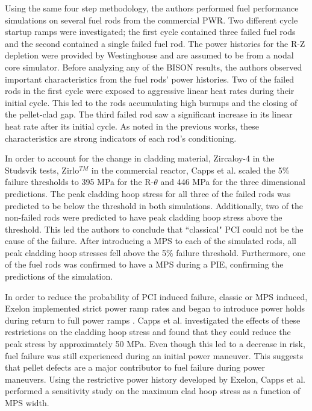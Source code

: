 \documentclass[edeposit,fullpage,11pt]{uiucthesis2009}
\begin{document}
Using the same four step methodology, the authors performed fuel performance simulations on several fuel rods from the commercial \gls{PWR}.
Two different cycle startup ramps were investigated; the first cycle contained three failed fuel rods and the second contained a single failed fuel rod.
The power histories for the R-Z depletion were provided by Westinghouse and are assumed to be from a nodal core simulator.
Before analyzing any of the BISON results, the authors observed important characteristics from the fuel rods' power histories.
Two of the failed rods in the first cycle were exposed to aggressive linear heat rates during their initial cycle.
This led to the rods accumulating high burnups and the closing of the pellet-clad gap.
The third failed rod saw a significant increase in its linear heat rate after its initial cycle.
As noted in the previous works, these characteristics are strong indicators of each rod's conditioning.

In order to account for the change in cladding material, Zircaloy-4 in the Studsvik tests, Zirlo$^{TM}$ in the commercial reactor, Capps et al. scaled the 5\% failure thresholds to 395 MPa for the R-$\theta$ and 446 MPa for the three dimensional predictions.
The peak cladding hoop stress for all three of the failed rods was predicted to be below the threshold in both simulations.
Additionally, two of the non-failed rods were predicted to have peak cladding hoop stress above the threshold. 
This led the authors to conclude that ``classical" \gls{PCI} could not be the cause of the failure.
After introducing a \gls{MPS} to each of the simulated rods, all peak cladding hoop stresses fell above the 5\% failure threshold.
Furthermore, one of the fuel rods was confirmed to have a \gls{MPS} during a \gls{PIE}, confirming the predictions of the simulation.

In order to reduce the probability of \gls{PCI} induced failure, classic or \gls{MPS} induced, Exelon implemented strict power ramp rates and began to introduce power holds during return to full power ramps \cite{capps_pci_2017}.
Capps et al. investigated the effects of these restrictions on the cladding hoop stress and found that they could reduce the peak stress by approximately 50 MPa.
Even though this led to a decrease in risk, fuel failure was still experienced during an initial power maneuver.
This suggests that pellet defects are a major contributor to fuel failure during power maneuvers. 
Using the restrictive power history developed by Exelon, Capps et al. performed a sensitivity study on the maximum clad hoop stress as a function of \gls{MPS} width.
\end{document}
